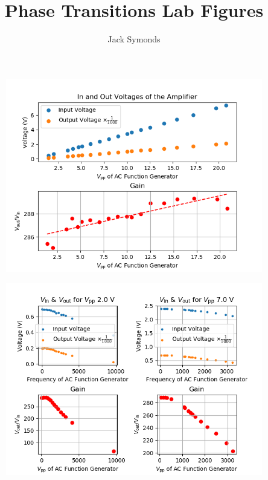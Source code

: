 \documentclass[8pt, a4paper]{article}
\title{Phase Transitions Lab Figures}
\author{Jack Symonds}
\date{}
\begin{document}
\begin{figure}[h]
\includegraphics{va.png}
\end{figure}




\newpage
\begin{figure}[h]
\includegraphics{vf.png}
\end{figure}


\end{document}
